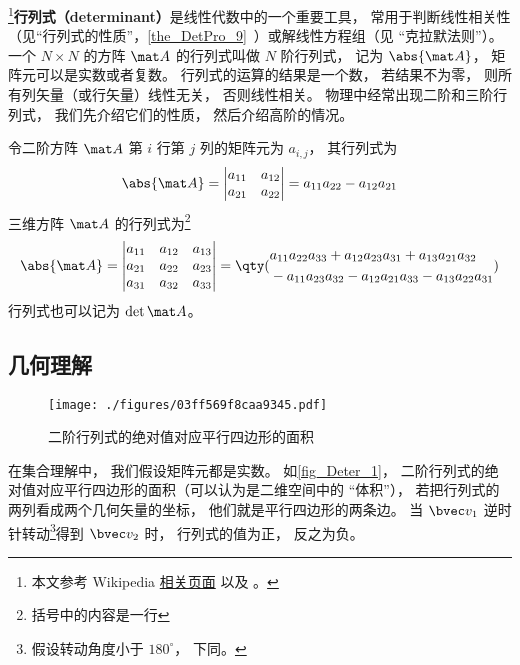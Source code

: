 

\footnote{本文参考 Wikipedia \href{https://en.wikipedia.org/wiki/Determinant}{相关页面} 以及 \cite{同济线}。}\textbf{行列式（determinant）}是线性代数中的一个重要工具， 常用于判断线性相关性（见“行列式的性质”，\autoref{the_DetPro_9}~）或解线性方程组（见 “克拉默法则”）。一个 $N\times N$ 的方阵 $\mat A$ 的行列式叫做 $N$ 阶行列式， 记为 $\abs{\mat A}$， 矩阵元可以是实数或者复数。 行列式的运算的结果是一个数， 若结果不为零， 则所有列矢量（或行矢量）线性无关， 否则线性相关。 物理中经常出现二阶和三阶行列式， 我们先介绍它们的性质， 然后介绍高阶的情况。

令二阶方阵 $\mat A$ 第 $i$ 行第 $j$ 列的矩阵元为 $a_{i,j}$， 其行列式为
\begin{equation}\label{eq_Deter_1}
\abs{\mat A} =
\begin{vmatrix}
a_{11} & a_{12} \\
a_{21} & a_{22}
\end{vmatrix} = a_{11}a_{22} - a_{12}a_{21}
\end{equation}
三维方阵 $\mat A$ 的行列式为\footnote{括号中的内容是一行}
\begin{equation}\label{eq_Deter_2}
\abs{\mat A} = 
\begin{vmatrix}
a_{11} & a_{12} & a_{13} \\
a_{21} & a_{22} & a_{23} \\
a_{31} & a_{32} & a_{33}
\end{vmatrix}
=
\qty(
\begin{aligned}
&a_{11}a_{22}a_{33} + a_{12}a_{23}a_{31} + a_{13}a_{21}a_{32} \\
&- a_{11}a_{23}a_{32} - a_{12}a_{21}a_{33} - a_{13}a_{22}a_{31}
\end{aligned}
)
\end{equation}
行列式也可以记为 $\det{\mat A}$。

\subsection{几何理解}

\begin{figure}[ht]
\centering
\texttt{[image: ./figures/03ff569f8caa9345.pdf]}
\caption{二阶行列式的绝对值对应平行四边形的面积} \label{fig_Deter_1}
\end{figure}
在集合理解中， 我们假设矩阵元都是实数。 如\autoref{fig_Deter_1}， 二阶行列式的绝对值对应平行四边形的面积（可以认为是二维空间中的 “体积”）， 若把行列式的两列看成两个几何矢量的坐标， 他们就是平行四边形的两条边。 当 $\bvec v_1$ 逆时针转动\footnote{假设转动角度小于 $180^\circ$， 下同。}得到 $\bvec v_2$ 时， 行列式的值为正， 反之为负。

